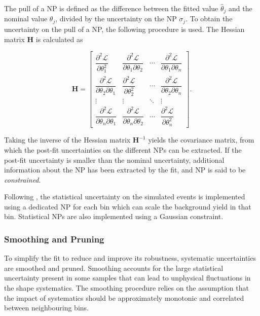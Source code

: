 The pull of a NP is defined as the difference between the fitted value $\hat{\theta}_j$ and the nominal value $\theta_j$, divided by the uncertainty on the NP $\sigma_j$.
To obtain the  uncertainty on the pull of a NP, the following procedure is used.
The Hessian matrix $\mathbf{H}$ is calculated as


\begin{equation}
  \mathbf{H} =
  \begin{bmatrix}
    \dfrac{\partial^{2}\mathcal{L}}{\partial \theta_{1}^{2}} &
    \dfrac {\partial^{2}\mathcal{L}}{\partial \theta_{1} \partial \theta_{2}}& \cdots &
    \dfrac{\partial ^{2}\mathcal{L}}{\partial \theta_{1} \partial \theta_{n}}\\[2ex]
    \dfrac{\partial^{2}\mathcal{L}}{\partial \theta_{2} \partial \theta_{1}}&
    \dfrac{\partial^{2}\mathcal{L}}{\partial \theta_{2}^{2}}&\cdots &
    \dfrac{\partial^{2}\mathcal{L}}{\partial \theta_{2} \partial \theta_{n}}\\[2ex]
    \vdots &\vdots &\ddots &\vdots \\[2.2ex]
    \dfrac{\partial^{2}\mathcal{L}}{\partial \theta_{n} \partial \theta_{1}}&
    \dfrac{\partial ^{2}\mathcal{L}}{\partial \theta_{n} \partial \theta_{2}}&\cdots &
    \dfrac{\partial^{2}\mathcal{L}}{\partial \theta_{n}^{2}}
  \end{bmatrix}   . 
\end{equation}

Taking the inverse of the Hessian matrix $\mathbf{H}^{-1}$ yields the covariance matrix, from which the post-fit uncertainties on the different NPs can be extracted.
If the post-fit uncertainty is smaller than the nominal uncertainty, additional information about the NP has been extracted by the fit, and NP is said to be \textit{constrained}.

Following , the statistical uncertainty on the simulated events is implemented using a dedicated NP for each bin which can scale the background yield in that bin.
Statistical NPs are also implemented using a Gaussian constraint.

\subsubsection{Smoothing and Pruning}

To simplify the fit to reduce and improve its robustness, systematic uncertainties are smoothed and pruned.
Smoothing accounts for the large statistical uncertainty present in some samples that can lead to unphysical fluctuations in the shape systematics.
The smoothing procedure relies on the assumption that the impact of systematics should be approximately monotonic and correlated between neighbouring bins.

